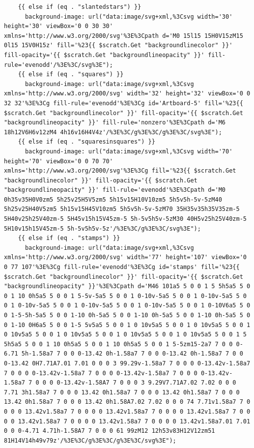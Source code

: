\documentclass[11pt]{article}
\begin{document}
\begin{enumerate}
\begin{verbatim}
    {{ else if (eq . "slantedstars") }}
      background-image: url("data:image/svg+xml,%3Csvg width='30' height='30' viewBox='0 0 30 30' xmlns='http://www.w3.org/2000/svg'%3E%3Cpath d='M0 15l15 15H0V15zM15 0l15 15V0H15z' fill='%23{{ $scratch.Get "backgroundlinecolor" }}' fill-opacity='{{ $scratch.Get "backgroundlineopacity" }}' fill-rule='evenodd'/%3E%3C/svg%3E");
    {{ else if (eq . "squares") }}
      background-image: url("data:image/svg+xml,%3Csvg xmlns='http://www.w3.org/2000/svg' width='32' height='32' viewBox='0 0 32 32'%3E%3Cg fill-rule='evenodd'%3E%3Cg id='Artboard-5' fill='%23{{ $scratch.Get "backgroundlinecolor" }}' fill-opacity='{{ $scratch.Get "backgroundlineopacity" }}' fill-rule='nonzero'%3E%3Cpath d='M6 18h12V6H6v12zM4 4h16v16H4V4z'/%3E%3C/g%3E%3C/g%3E%3C/svg%3E");
    {{ else if (eq . "squaresinsquares") }}
      background-image: url("data:image/svg+xml,%3Csvg width='70' height='70' viewBox='0 0 70 70' xmlns='http://www.w3.org/2000/svg'%3E%3Cg fill='%23{{ $scratch.Get "backgroundlinecolor" }}' fill-opacity='{{ $scratch.Get "backgroundlineopacity" }}' fill-rule='evenodd'%3E%3Cpath d='M0 0h35v35H0V0zm5 5h25v25H5V5zm5 5h15v15H10V10zm5 5h5v5h-5v-5zM40 5h25v25H40V5zm5 5h15v15H45V10zm5 5h5v5h-5v-5zM70 35H35v35h35V35zm-5 5H40v25h25V40zm-5 5H45v15h15V45zm-5 5h-5v5h5v-5zM30 40H5v25h25V40zm-5 5H10v15h15V45zm-5 5h-5v5h5v-5z'/%3E%3C/g%3E%3C/svg%3E");
    {{ else if (eq . "stamps") }}
      background-image: url("data:image/svg+xml,%3Csvg xmlns='http://www.w3.org/2000/svg' width='77' height='107' viewBox='0 0 77 107'%3E%3Cg fill-rule='evenodd'%3E%3Cg id='stamps' fill='%23{{ $scratch.Get "backgroundlinecolor" }}' fill-opacity='{{ $scratch.Get "backgroundlineopacity" }}'%3E%3Cpath d='M46 101a5 5 0 0 1 5 5h5a5 5 0 0 1 10 0h5a5 5 0 0 1 5-5v-5a5 5 0 0 1 0-10v-5a5 5 0 0 1 0-10v-5a5 5 0 0 1 0-10v-5a5 5 0 0 1 0-10v-5a5 5 0 0 1 0-10v-5a5 5 0 0 1 0-10V6a5 5 0 0 1-5-5h-5a5 5 0 0 1-10 0h-5a5 5 0 0 1-10 0h-5a5 5 0 0 1-10 0h-5a5 5 0 0 1-10 0H6a5 5 0 0 1-5 5v5a5 5 0 0 1 0 10v5a5 5 0 0 1 0 10v5a5 5 0 0 1 0 10v5a5 5 0 0 1 0 10v5a5 5 0 0 1 0 10v5a5 5 0 0 1 0 10v5a5 5 0 0 1 5 5h5a5 5 0 0 1 10 0h5a5 5 0 0 1 10 0h5a5 5 0 0 1 5-5zm15-2a7 7 0 0 0-6.71 5h-1.58a7 7 0 0 0-13.42 0h-1.58a7 7 0 0 0-13.42 0h-1.58a7 7 0 0 0-13.42 0H7.71A7.01 7.01 0 0 0 3 99.29v-1.58a7 7 0 0 0 0-13.42v-1.58a7 7 0 0 0 0-13.42v-1.58a7 7 0 0 0 0-13.42v-1.58a7 7 0 0 0 0-13.42v-1.58a7 7 0 0 0 0-13.42v-1.58A7 7 0 0 0 3 9.29V7.71A7.02 7.02 0 0 0 7.71 3h1.58a7 7 0 0 0 13.42 0h1.58a7 7 0 0 0 13.42 0h1.58a7 7 0 0 0 13.42 0h1.58a7 7 0 0 0 13.42 0h1.58A7.02 7.02 0 0 0 74 7.71v1.58a7 7 0 0 0 0 13.42v1.58a7 7 0 0 0 0 13.42v1.58a7 7 0 0 0 0 13.42v1.58a7 7 0 0 0 0 13.42v1.58a7 7 0 0 0 0 13.42v1.58a7 7 0 0 0 0 13.42v1.58a7.01 7.01 0 0 0-4.71 4.71h-1.58A7 7 0 0 0 61 99zM12 12h53v83H12V12zm51 81H14V14h49v79z'/%3E%3C/g%3E%3C/g%3E%3C/svg%3E");

\end{verbatim}
\end{enumerate}
\end{document}
